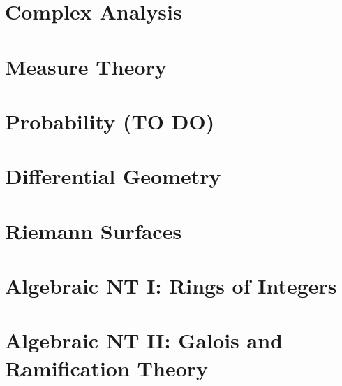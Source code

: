 \documentclass[11pt,twoside=semi,openright,numbers=noenddot,titlepage=false]{scrbook}
\begin{document}
\part{Complex Analysis}
\label{part:cmplxana}
\parttoc





\part{Measure Theory}
\label{part:measure}
\parttoc






\part{Probability (TO DO)}
\label{part:prob}
\parttoc



\part{Differential Geometry}
\label{part:diffgeo}
\parttoc



\part{Riemann Surfaces}
\label{part:riemann}
\parttoc







\part{Algebraic NT I: Rings of Integers}
\label{part:algnt1}
\parttoc







\part{Algebraic NT II: Galois and Ramification Theory}
\label{part:algnt2}
\parttoc




\end{document}
